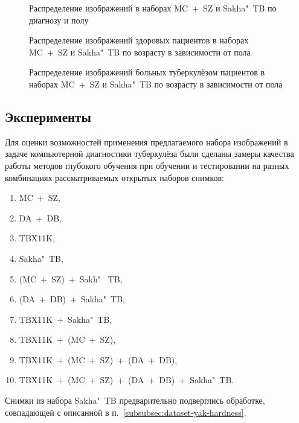 \begin{figure}[ht]
	\caption{Распределение изображений в наборах MC~+~SZ и Sakha"~TB по диагнозу и полу}
	\label{fig:sex-distr}
\end{figure}

\begin{figure}[ht]
	\caption{Распределение изображений здоровых пациентов в наборах MC~+~SZ и Sakha"~TB по возрасту в зависимости от пола}
	\label{fig:age-distr-healthy}
\end{figure}

\begin{figure}[ht]
	\caption{Распределение изображений больных туберкулёзом пациентов в наборах MC~+~SZ и Sakha"~TB по возрасту в зависимости от пола}
	\label{fig:age-distr-tb}
\end{figure}

\subsection{Эксперименты}

Для оценки возможностей применения предлагаемого набора изображений в задаче компьютерной диагностики туберкулёза были сделаны замеры качества работы методов глубокого обучения при обучении и тестировании на разных комбинациях рассматриваемых открытых наборов снимков:
\begin{enumerate}[beginpenalty=10000]
	\item MC~+~SZ,
	\item DA~+~DB,
	\item TBX11K,
	\item Sakha"~TB,
	\item (MC~+~SZ)~+~Sakh"~ TB,
	\item (DA~+~DB)~+~Sakha"~TB,
	\item TBX11K~+~Sakha"~TB,
	\item TBX11K~+~(MC~+~SZ),
	\item TBX11K~+~(MC~+~SZ)~+~(DA~+~DB),
	\item TBX11K~+~(MC~+~SZ)~+~(DA~+~DB)~+~Sakha"~TB.
\end{enumerate}

Снимки из набора Sakha"~TB предварительно подверглись обработке, совпадающей с описанной в п.~\ref{subsubsec:dataset-yak-hardness}.

